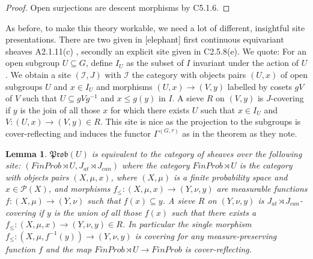 \documentclass[a4paper]{amsproc}
\theoremstyle{plain}
\newtheorem{lemma}[theorem]{Lemma}
\theoremstyle{definition}
\theoremstyle{remark}
\numberwithin{equation}{section}
\begin{document}
\begin{proof} Open surjections are descent morphisms by C5.1.6.
\end{proof}
As before, to make this theory workable, we need a lot of different, insightful site presentations. There are two given in [elephant] first continuous equivariant sheaves A2.1.11(c)%
, secondly an explicit site given in C2.5.8(e). We quote:\newline
\indent For an open subgroup $U\subseteq G$, define $I_U$ as the subset of $I$ invariant under the action of $U$. We obtain a site $(\mathcal{I},J)$ with $\mathcal{I}$ the category with objects pairs $(U,x)$ of open subgroups $U$ and $x\in I_U$ and morphisms $(U,x)\rightarrow (V,y)$ labelled by cosets $gV$ of $V$ such that $U\subseteq gVg^{-1}$ and $x\leq g(y)$ in $I$.  A sieve $R$ on $(V,y)$ is $J$-covering if $y$ is the join of all those $x$ for which there exists $U$ such that $x\in I_U$ and $V:(U,x)\rightarrow (V,y)\in R$. This site is nice as the projection to the subgroups is cover-reflecting and induces the functor $\Gamma^{(G,\tau)}$ as in the theorem as they note.
\begin{lemma} $\mathfrak{Prob}(U)$ is equivalent to the category of sheaves over the following site: $(FinProb\rtimes U ,J_{at}\rtimes J_{can})$ where the category $FinProb\rtimes U$ is the category with objects pairs $(X,\mu,x)$, where $(X,\mu)$ is a finite probability space and $x\in \mathcal{P}(X)$, and morphisms $f_{\leq}:(X,\mu, x)\rightarrow (Y,\nu, y)$ are measurable functions $f:(X,\mu)\rightarrow (Y,\nu)$ such that $f(x)\subseteq y$. A sieve $R$ on $(Y,\nu, y)$ is $J_{at}\rtimes J_{can}$-covering if $y$ is the union of all those $f(x)$ such that there exists a $f_{\leq}:(X,\mu,x)\rightarrow (Y,\nu,y)\in R$. In particular the single morphism $f_{\leq}:(X,\mu,f^{-1}(y))\rightarrow (Y,\nu,y)$ is covering for any measure-preserving  function $f$ and the map $FinProb\rtimes U\rightarrow FinProb$ is cover-reflecting.

\end{lemma}
\end{document}
